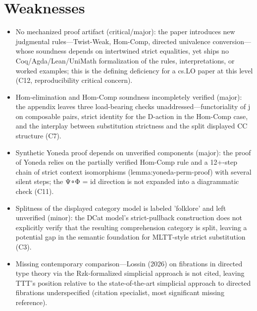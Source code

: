 \documentclass[11pt]{article}
\begin{document}
\section*{Weaknesses}
\begin{itemize}[leftmargin=*]
  \item No mechanized proof artifact (critical/major): the paper introduces new judgmental rules—Twist-Weak, Hom-Comp, directed univalence conversion—whose soundness depends on intertwined strict equalities, yet ships no Coq/Agda/Lean/UniMath formalization of the rules, interpretations, or worked examples; this is the defining deficiency for a cs.LO paper at this level (C12, reproducibility critical concern).
  \item Hom-elimination and Hom-Comp soundness incompletely verified (major): the appendix leaves three load-bearing checks unaddressed—functoriality of j on composable pairs, strict identity for the D-action in the Hom-Comp case, and the interplay between substitution strictness and the split displayed CC structure (C7).
  \item Synthetic Yoneda proof depends on unverified components (major): the proof of Yoneda relies on the partially verified Hom-Comp rule and a 12+-step chain of strict context isomorphisms (lemma:yoneda-perm-proof) with several silent steps; the Ψ∘Φ = id direction is not expanded into a diagrammatic check (C11).
  \item Splitness of the displayed category model is labeled 'folklore' and left unverified (minor): the DCat model's strict-pullback construction does not explicitly verify that the resulting comprehension category is split, leaving a potential gap in the semantic foundation for MLTT-style strict substitution (C3).
  \item Missing contemporary comparison—Lossin (2026) on fibrations in directed type theory via the Rzk-formalized simplicial approach is not cited, leaving TTT's position relative to the state-of-the-art simplicial approach to directed fibrations underspecified (citation specialist, most significant missing reference).
\end{itemize}
\end{document}
